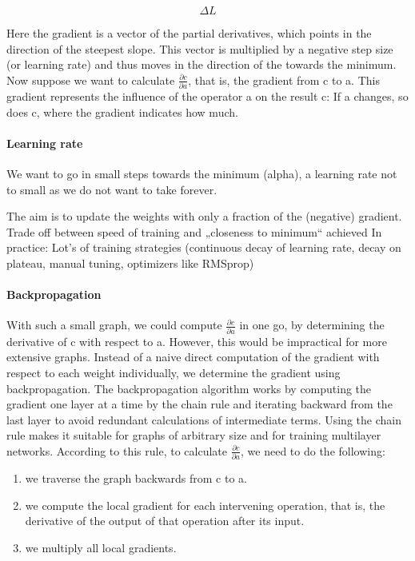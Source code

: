 $$ \Delta L $$

Here the gradient is a vector of the partial derivatives, which points in the direction of the steepest slope. This vector is multiplied by a negative step size (or learning rate) and thus moves in the direction of the towards the minimum. Now suppose we want to calculate $\frac{\partial c}{\partial a}$, that is, the gradient from c to a. This gradient represents the influence of the operator a on the result c: If a changes, so does c, where the gradient indicates how much. \\

\paragraph{Learning rate}

We want to go in small steps towards the minimum (alpha), a learning rate
not to small as we do not want to take forever.

The aim is to update the weights with only a fraction of the (negative) gradient. Trade off between speed of training and „closeness to minimum“ achieved
In practice: Lot’s of training strategies (continuous decay of learning rate, decay on plateau, manual tuning, optimizers like RMSprop) \\

\paragraph{Backpropagation}

With such a small graph, we could compute $\frac{\partial c}{\partial a}$ in one go, by determining the derivative of c with respect to a. However, this would be
impractical for more extensive graphs. Instead of a naive direct computation of the gradient with respect to each weight individually, we determine the gradient using backpropagation. The backpropagation algorithm works by computing the gradient one layer at a time by the chain rule and iterating backward from the last layer to avoid redundant calculations of intermediate terms. Using the chain rule makes it suitable for graphs of arbitrary size and for training multilayer networks. According to this rule, to calculate $\frac{\partial c}{\partial a}$, we need to do the following:

\begin{enumerate}
	\item we traverse the graph backwards from c to a.
	\item we compute the local gradient for each intervening operation, that is, the derivative of the output of that operation after its input.
	\item we multiply all local gradients.
\end{enumerate}

